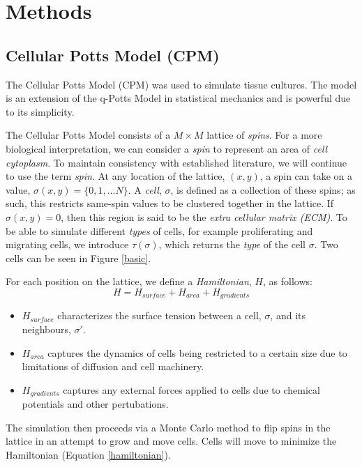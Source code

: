 \documentclass[12pt]{article}
\begin{document}
% 
% 

\section{Methods}
\subsection{Cellular Potts Model (CPM)}
The Cellular Potts Model (CPM) \cite{Graner1992} was used to simulate tissue cultures. The model is an extension of the q-Potts Model in statistical mechanics and is powerful due to its simplicity. 

The Cellular Potts Model consists of a $M\times M$ lattice of \emph{spins}. For a more biological interpretation, we can consider a \emph{spin} to represent an area of \emph{cell cytoplasm}. To maintain consistency with established literature, we will continue to use the term \emph{spin}. At any location of the lattice, $(x,y)$, a spin can take on a value, $\sigma(x,y) = \{0,1,\ldots N\}$. A \emph{cell}, $\sigma$, is defined as a collection of these spins; as such, this restricts same-spin values to be clustered together in the lattice. If $\sigma(x,y) = 0$, then this region is said to be the \emph{extra cellular matrix (ECM)}. To be able to simulate different \emph{types} of cells, for example proliferating and migrating cells, we introduce $\tau(\sigma)$, which returns the \emph{type} of the cell $\sigma$. Two cells can be seen in Figure \ref{basic}.

For each position on the lattice, we define a \emph{Hamiltonian}, $H$, as follows:
\begin{equation}
	H = H_{surface} + H_{area} + H_{gradients}
	\label{hamiltonian}
\end{equation}

\begin{itemize}
	\item $H_{surface}$ characterizes the surface tension between a cell, $\sigma$, and its neighbours, $\sigma'$.
	\item $H_{area}$ captures the dynamics of cells being restricted to a certain size due to limitations of diffusion and cell machinery. 
	\item $H_{gradients}$ captures any external forces applied to cells due to chemical potentials and other pertubations.
\end{itemize}

The simulation then proceeds via a Monte Carlo method to flip spins in the lattice in an attempt to grow and move cells. Cells will move to minimize the Hamiltonian (Equation \ref{hamiltonian}).
\end{document}

